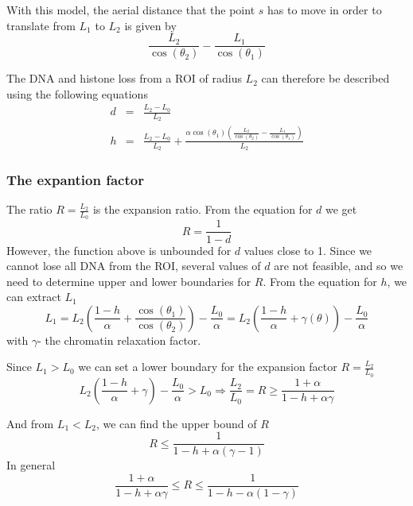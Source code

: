 \documentclass[12pt]{report}
\begin{document}
 With this model, the aerial distance that the point $s$ has to move in order to translate from $L_1$ to $L_2$ is given by 
 \begin{equation*}
 \frac{L_2}{\cos(\theta_2)}-\frac{L_1}{\cos(\theta_1)}
 \end{equation*}
 
The DNA and histone loss from a ROI of radius $L_2$ can therefore be described using the following equations 
\begin{eqnarray}
 d &=& \frac{L_2-L_0}{L_2}\\
 h &=& \frac{L_2-L_0}{L_2}+\frac{\alpha \cos(\theta_1)\left(\frac{L_2}{\cos(\theta_2)} -\frac{L_1}{\cos(\theta_1)}\right)}{L_2}
\end{eqnarray}

\subsubsection{The expantion factor}
The ratio $R=\frac{L_2}{L_0}$ is the expansion ratio. From the equation for $d$ we get 
\begin{equation}
R=\frac{1}{1-d}
\end{equation}
 However, the function above is unbounded for $d$ values close to 1. Since we cannot lose all DNA from the ROI, several values of $d$ are not feasible, and so we need to determine upper and lower boundaries for $R$. From the equation for $h$, we can extract $L_1$ 
 \begin{equation}
 L_1 = L_2\left( \frac{1-h}{\alpha} +\frac{\cos(\theta_1)}{\cos(\theta_2)}\right)-\frac{L_0}{\alpha}=L_2\left(\frac{1-h}{\alpha}+\gamma(\theta) \right)-\frac{L_0}{\alpha}
 \end{equation}
 with $\gamma$- the chromatin relaxation factor. 
 
 Since $L_1>L_0$ we can set a lower boundary for the expansion factor $R=\frac{L_2}{L_0}$
 \begin{equation*}
 L_2\left(\frac{1-h}{\alpha}+\gamma\right)-\frac{L_0}{\alpha}>L_0 \Rightarrow \frac{L_2}{L_0}=R\geq \frac{1+\alpha}{1-h+\alpha\gamma}
 \end{equation*} 
 
 And from $L_1<L_2$, we can find the upper bound of $R$
 \begin{equation*}
 R \leq \frac{1}{1-h+\alpha(\gamma -1)}
 \end{equation*}
  In general 
  \begin{equation}\label{eq:expansionFactorRange}
  \frac{1+\alpha}{1-h+\alpha \gamma}\leq R \leq \frac{1}{1-h-\alpha(1-\gamma)}
  \end{equation}
\end{document}
